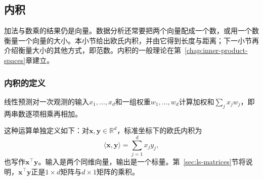 \subsection{内积}

加法与数乘的结果仍是向量。数据分析还常要把两个向量配成一个数，或用一个数衡量一个向量的大小。本小节给出欧氏内积，并由它得到长度与距离；下一小节再介绍衡量大小的其他方式，即范数。内积的一般理论在第~\ref{chap:inner-product-spaces}章建立。

\subsubsection{内积的定义}
\label{sec:ls-inner-products}
\label{sec:prelim-vector-inner-length}

线性预测对一次观测的输入$x_1,\ldots,x_d$和一组权重$w_1,\ldots,w_d$计算加权和$\sum_jx_jw_j$，即两串数逐项相乘再相加。

这种运算单独定义如下：对$\bm x,\bm y\in\mathbb R^d$，标准坐标下的欧氏内积为
\begin{equation}
 \langle\bm x,\bm y\rangle
 =\sum_{j=1}^d x_jy_j,
 \label{eq:ls-euclidean-inner-product}
\end{equation}
也写作$\bm x^\top\bm y$。输入是两个同维向量，输出是一个标量。第~\ref{sec:ls-matrices}节将说明，$\bm x^\top\bm y$正是$1\times d$矩阵与$d\times1$矩阵的乘积。

